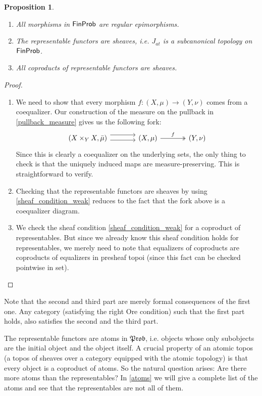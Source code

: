 \documentclass[a4paper]{amsproc}
\theoremstyle{plain}
\newtheorem{proposition}[theorem]{Proposition}
\theoremstyle{definition}
\theoremstyle{remark}
\numberwithin{equation}{section}
\newcommand{\FinProb}{\textup{\textsf{FinProb}}}
\newcommand{\Prob}{\mathfrak{Prob}}
\begin{document}
\begin{proposition}\label{subcanonical}
    \begin{enumerate}
        \item All morphisms in $\FinProb$ are regular epimorphisms.
        \item The representable functors are sheaves, i.e. $J_{at}$ is a subcanonical topology on $\FinProb$.
        \item All coproducts of representable functors are sheaves.
    \end{enumerate}
\end{proposition}
\begin{proof}
    \begin{enumerate}
        \item We need to show that every morphism $f:(X,\mu)\rightarrow (Y, \nu)$ comes from a coequalizer. Our construction of the measure on the pullback in \ref{pullback_measure} gives us the following fork:
        \[
        \begin{tikzcd}[column sep=large]
        (X \times_Y X, \bar{\mu}) \arrow[r, shift left=2] \arrow[r, shift right] & (X,\mu) \arrow[r, "f", two heads] & (Y,\nu)
        \end{tikzcd}
        \]
        Since this is clearly a coequalizer on the underlying sets, the only thing to check is that the uniquely induced maps are measure-preserving. This is straightforward to verify.

        \item Checking that the representable functors are sheaves by using \ref{sheaf_condition_weak} reduces to the fact that the fork above is a coequalizer diagram.

        \item We check the sheaf condition \ref{sheaf_condition_weak} for a coproduct of representables. But since we already know this sheaf condition holds for representables, we merely need to note that equalizers of coproducts are coproducts of equalizers in presheaf topoi (since this fact can be checked pointwise in set).
    \end{enumerate}
\end{proof}

Note that the second and third part are merely formal consequences of the first one. Any category (satisfying the right Ore condition) such that the first part holds, also satisfies the second and the third part.

The representable functors are atoms in $\Prob$, i.e. objects whose only subobjects are the initial object and the object itself. A crucial property of an atomic topos (a topos of sheaves over a category equipped with the atomic topology) is that every object is a coproduct of atoms. So the natural question arises: Are there more atoms than the representables? In \ref{atoms} we will give a complete list of the atoms and see that the representables are not all of them.
\end{document}
